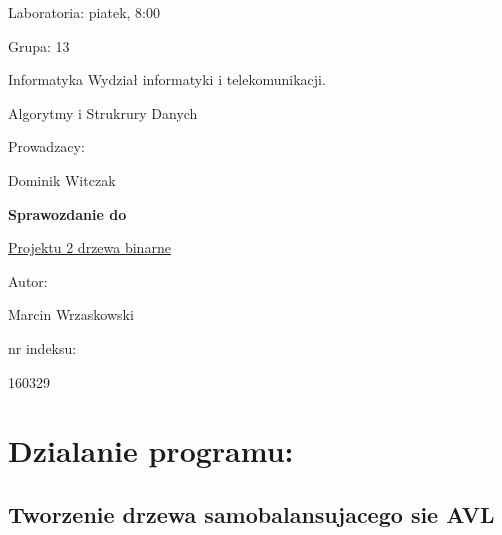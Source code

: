 \documentclass[12pt]{article}
\begin{document}
\begin{flushright}

Laboratoria: piatek, 8:00

Grupa: 13

Informatyka Wydział informatyki i telekomunikacji.

\end{flushright}

\hspace{4cm}

\begin{center}

Algorytmy i Strukrury Danych

Prowadzacy:

Dominik Witczak

\end{center}

\hspace{4cm}

\begin{center}

\textbf{Sprawozdanie do \LARGE}

\hspace{2cm}

\underline{Projektu 2 drzewa binarne}

\end{center}

\hspace{30cm}

\begin{flushright}

Autor:

Marcin Wrzaskowski

nr indeksu:

160329

\end{flushright}

\pagebreak

\section{Dzialanie programu: }

\subsection{Tworzenie drzewa samobalansujacego sie AVL}
\end{document}
